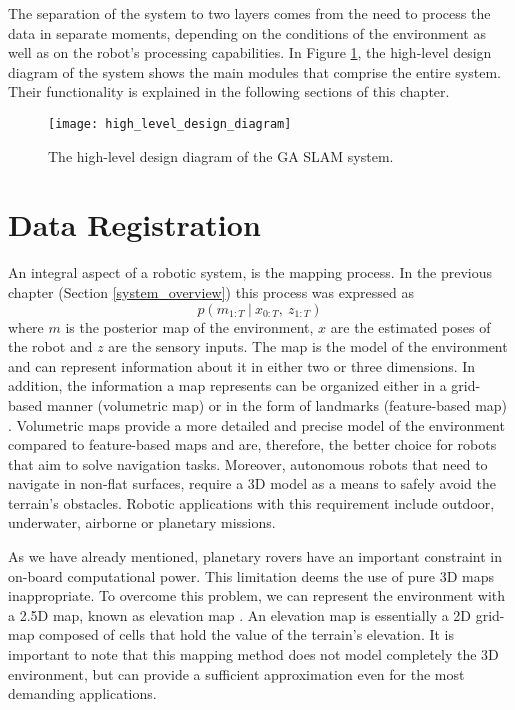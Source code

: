 The separation of the system to two layers comes from the need to process the
data in separate moments, depending on the conditions of the environment as
well as on the robot's processing capabilities.
In Figure \ref{fig:high_level_design_diagram}, the high-level design diagram
of the system shows the main modules that comprise the entire system.
Their functionality is explained in the following sections of this chapter.

\begin{figure}[h!]
    \centering
    \texttt{[image: high\_level\_design\_diagram]}
    \caption[High level design diagram]{
        The high-level design diagram of the GA SLAM system.
    }
    \label{fig:high_level_design_diagram}
\end{figure}

\section{Data Registration}

An integral aspect of a robotic system, is the mapping process.
In the previous chapter (Section \ref{system_overview}) this process
was expressed as
\begin{equation}
    p(m_{1:T} \ | \ x_{0:T} ,\ z_{1:T})
\end{equation}
where
$m$ is the posterior map of the environment,
$x$ are the estimated poses of the robot and
$z$ are the sensory inputs.
The map is the model of the environment and can represent information about
it in either two or three dimensions.
In addition, the information a map represents can be organized either in
a grid-based manner (volumetric map) or in the form of landmarks
(feature-based map) \parencite{Jefferies2008}.
Volumetric maps provide a more detailed and precise model of the environment
compared to feature-based maps and are, therefore, the better choice for
robots that aim to solve navigation tasks.
Moreover, autonomous robots that need to navigate in non-flat surfaces,
require a 3D model as a means to safely avoid the terrain's obstacles.
Robotic applications with this requirement include outdoor, underwater,
airborne or planetary missions.

As we have already mentioned, planetary rovers have an important constraint
in on-board computational power.
This limitation deems the use of pure 3D maps inappropriate.
To overcome this problem, we can represent the environment with a 2.5D map,
known as elevation map \parencite{Cremean2005}.
An elevation map is essentially a 2D grid-map composed of cells that hold
the value of the terrain's elevation.
It is important to note that this mapping method does not model completely
the 3D environment, but can provide a sufficient approximation even for
the most demanding applications.

